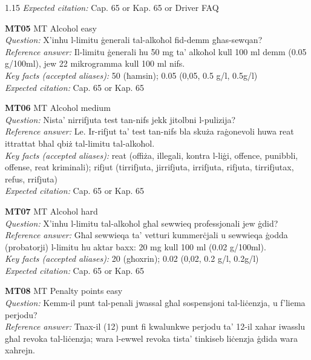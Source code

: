 \begin{spacing}{1.15}
\textit{Expected citation:} Cap. 65 or Kap. 65 or Driver FAQ
\par\vspace{5pt}
\noindent\textbf{MT05} \quad MT \quad Alcohol \quad easy \\
\textit{Question:} X'inhu l-limitu ġenerali tal-alkoħol fid-demm għas-sewqan? \\
\textit{Reference answer:} Il-limitu ġenerali hu 50 mg ta' alkoħol kull 100 ml demm (0.05 g/100ml), jew 22 mikrogramma kull 100 ml nifs. \\
\textit{Key facts (accepted aliases):} 50 (ħamsin); 0.05 (0,05, 0.5 g/l, 0.5g/l) \\
\textit{Expected citation:} Cap. 65 or Kap. 65
\par\vspace{5pt}
\noindent\textbf{MT06} \quad MT \quad Alcohol \quad medium \\
\textit{Question:} Nista' nirrifjuta test tan-nifs jekk jitolbni l-pulizija? \\
\textit{Reference answer:} Le. Ir-rifjut ta' test tan-nifs bla skuża raġonevoli huwa reat ittrattat bħal qbiż tal-limitu tal-alkoħol. \\
\textit{Key facts (accepted aliases):} reat (offiża, illegali, kontra l-liġi, offence, punibbli, offense, reat kriminali); rifjut (tirrifjuta, jirrifjuta, irrifjuta, rifjuta, tirrifjutax, refus, rrifjuta) \\
\textit{Expected citation:} Cap. 65 or Kap. 65
\par\vspace{5pt}
\noindent\textbf{MT07} \quad MT \quad Alcohol \quad hard \\
\textit{Question:} X'inhu l-limitu tal-alkoħol għal sewwieq professjonali jew ġdid? \\
\textit{Reference answer:} Għal sewwieqa ta' vetturi kummerċjali u sewwieqa ġodda (probatorji) l-limitu hu aktar baxx: 20 mg kull 100 ml (0.02 g/100ml). \\
\textit{Key facts (accepted aliases):} 20 (għoxrin); 0.02 (0,02, 0.2 g/l, 0.2g/l) \\
\textit{Expected citation:} Cap. 65 or Kap. 65
\par\vspace{5pt}
\noindent\textbf{MT08} \quad MT \quad Penalty points \quad easy \\
\textit{Question:} Kemm-il punt tal-penali jwassal għal sospensjoni tal-liċenzja, u f'liema perjodu? \\
\textit{Reference answer:} Tnax-il (12) punt fi kwalunkwe perjodu ta' 12-il xahar iwasslu għal revoka tal-liċenzja; wara l-ewwel revoka tista' tinkiseb liċenzja ġdida wara xahrejn. \\

\end{spacing}
